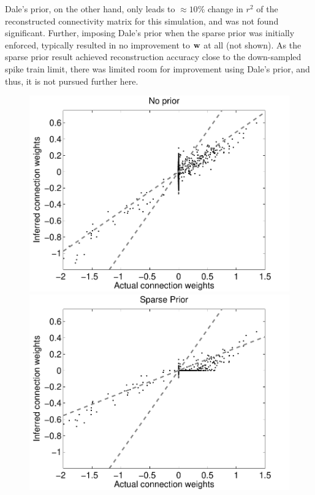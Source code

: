 Dale's prior, on the other hand, only leads to $\approx 10\%$ change in $r^2$ of the reconstructed connectivity matrix for this simulation, and was not found significant. Further, imposing Dale's prior when the sparse prior was initially enforced, typically resulted in no improvement to $\mathbf{w}$ at all (not shown).  As the sparse prior result achieved reconstruction accuracy close to the down-sampled spike train limit, there was limited room for improvement using Dale's prior, and thus, it is not pursued further here.

\begin{figure}[h]
\centering
\begin{minipage}[c]{0.45\hsize}
\includegraphics[width=\hsize]{../figs/FigureA10_regular_sol}
\end{minipage}
\begin{minipage}[c]{0.45\hsize}
\includegraphics[width=\hsize]{../figs/FigureA10_sparse_sol}

\end{minipage}
\end{figure}
